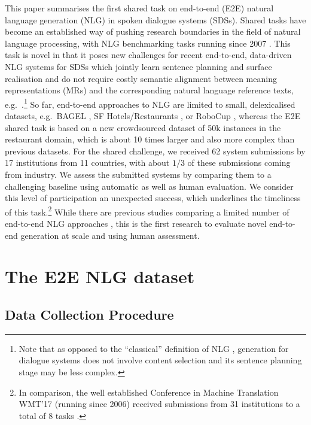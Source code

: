 \documentclass[11pt,a4paper]{article}
\begin{document}
This paper summarises the first shared task on 
 end-to-end (E2E) natural language generation (NLG) in spoken dialogue systems (SDSs). 
Shared tasks have become an established way of pushing research boundaries in the field of natural language processing, with NLG benchmarking tasks running since 2007 \citep{belz:GRE2007}. This task is novel in that it poses new challenges for 
recent end-to-end, data-driven NLG systems for SDSs which jointly learn sentence planning and surface realisation and do not require costly semantic alignment between meaning representations (MRs) and the corresponding natural language reference texts, e.g.\ \cite{jurcicek:2015:ACL,wen:emnlp2015,Mei:NAACL2016,Wen:NAACL16,SharmaHSSB16,Dusek:ACL16,vlachos:coling2016}.\footnote{Note that as opposed to the ``classical'' definition of NLG \cite{reiter_building_2000,gatt_survey_2018}, generation for dialogue systems does not involve content selection and its sentence planning stage may be less complex.}
So far, end-to-end approaches to NLG are limited to small, delexicalised datasets, e.g.\ BAGEL \citep{mairesse:acl2010}, SF Hotels/\hspace{0mm}Restaurants \citep{wen:emnlp2015}, or RoboCup \citep{chen2008learning}, whereas the E2E shared task is
based on a new crowdsourced dataset of 50k instances in the restaurant domain, which is about 10 times larger and also more complex than previous datasets.
For the shared challenge, we received 62 system submissions by 17 institutions from 11 countries, with about $1/3$ of these submissions coming from industry. 
We assess the submitted systems by comparing them to a challenging baseline using automatic as well as human evaluation.
We consider this level of participation an unexpected success, which underlines the timeliness of this task.\footnote{In comparison, the well established Conference in Machine Translation WMT’17 (running since 2006) received submissions from 31 institutions to a total of 8 tasks \citep{bojar2017findings}.}
While there are previous studies comparing a limited number of end-to-end NLG approaches \cite{Novikova:EMNLP2017,Wiseman:EMNLP17,WebNLG},
this is the first research to evaluate novel end-to-end generation at scale and using human assessment. 




\section{The E2E NLG dataset}\label{sec:dataset}

\subsection{Data Collection Procedure}\label{sec:collection}
\end{document}

